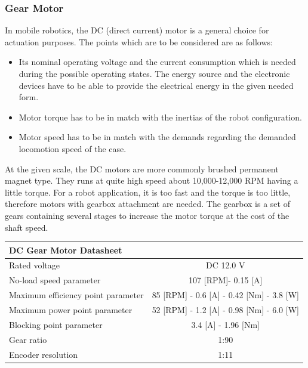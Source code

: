 \documentclass[12pt,english]{article}
\begin{document}
\subsubsection{Gear Motor}
In mobile robotics, the DC (direct current) motor is a general choice for actuation purposes. The points which are to be considered are as follows:
\begin{itemize}
	\item Its nominal operating voltage and the current consumption which is needed during the possible operating states. The energy source and the electronic devices have to be able to provide the electrical energy in the given needed form.
	\item Motor torque has to be in match with the inertias of the robot configuration.
	\item Motor speed has to be in match with the demands regarding the demanded locomotion speed of the case.
\end{itemize}
At the given scale, the DC motors are more commonly brushed permanent magnet type. They runs at quite high speed about 10,000-12,000 RPM having a little torque.\cite{dc_motor_5} For a robot application, it is too fast and the torque is too little, therefore motors with gearbox attachment are needed. The gearbox is a set of gears containing several stages to increase the motor torque at the cost of the shaft speed.
\begin{table}[]
	\begin{tabular}{lc}
		\hline
		\multicolumn{2}{l}{DC Gear Motor Datasheet}                                                   \\ \hline
		Rated voltage                      & DC 12.0 V                                                \\
		No-load speed parameter            & 107 {[}RPM{]}- 0.15 {[}A{]}                              \\
		Maximum efficiency point parameter & 85 {[}RPM{]} - 0.6 {[}A{]} - 0.42 {[}Nm{]} - 3.8 {[}W{]} \\
		Maximum power point parameter      & 52 {[}RPM{]} - 1.2 {[}A{]} - 0.98 {[}Nm{]} - 6.0 {[}W{]} \\
		Blocking point parameter           & 3.4 {[}A{]} - 1.96 {[}Nm{]}                              \\
		Gear ratio                         & 1:90                                                     \\
		Encoder resolution                 & 1:11                                                    
	\end{tabular}
\end{table}
\end{document}
